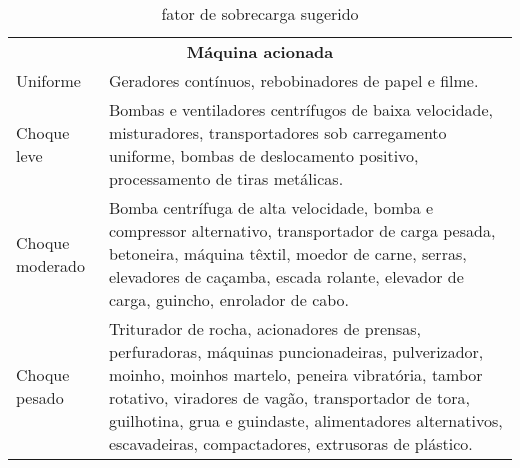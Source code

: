\begin{table}
\centering
\caption{\label{tab:1} fator de sobrecarga sugerido}
\begin{tabular}{ll}
\multicolumn{2}{c}{\textbf{Máquina acionada}}                                                                                                                                                                                                                                                                                                           \\
Uniforme          & Geradores contínuos,   rebobinadores de papel e filme.                                                                                                                                                                                                                                                                              \\
Choque leve       & Bombas   e ventiladores centrífugos de baixa velocidade, misturadores, transportadores   sob carregamento uniforme, bombas de deslocamento positivo, processamento de   tiras metálicas.                                                                                                                                            \\
Choque   moderado & Bomba   centrífuga de alta velocidade, bomba e compressor alternativo, transportador   de carga pesada, betoneira, máquina têxtil, moedor de carne, serras,   elevadores de caçamba, escada rolante, elevador de carga, guincho, enrolador   de cabo.                                                                               \\
Choque pesado     & Triturador de   rocha, acionadores de prensas, perfuradoras, máquinas puncionadeiras,   pulverizador, moinho, moinhos martelo, peneira vibratória, tambor rotativo,   viradores de vagão, transportador de tora, guilhotina, grua e guindaste,   alimentadores alternativos, escavadeiras, compactadores, extrusoras de   plástico.
\end{tabular}
\end{table}